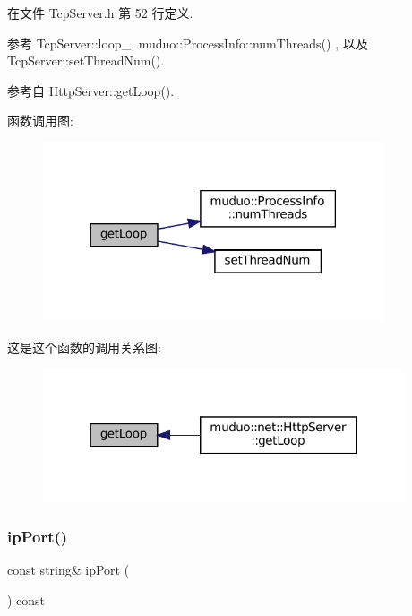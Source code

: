 在文件 Tcp\+Server.\+h 第 52 行定义.



参考 Tcp\+Server\+::loop\+\_\+, muduo\+::\+Process\+Info\+::num\+Threads() , 以及 Tcp\+Server\+::set\+Thread\+Num().



参考自 Http\+Server\+::get\+Loop().

函数调用图\+:
\nopagebreak
\begin{figure}[H]
\begin{center}
\leavevmode
\includegraphics[width=285pt]{classmuduo_1_1net_1_1TcpServer_aef1cbfe0592e8196e6c81b4db82a39ce_cgraph}
\end{center}
\end{figure}
这是这个函数的调用关系图\+:
\nopagebreak
\begin{figure}[H]
\begin{center}
\leavevmode
\includegraphics[width=303pt]{classmuduo_1_1net_1_1TcpServer_aef1cbfe0592e8196e6c81b4db82a39ce_icgraph}
\end{center}
\end{figure}
\mbox{\label{classmuduo_1_1net_1_1TcpServer_a99f658558edfb2a41612ef7be6884674}} 
\subsubsection{\texorpdfstring{ip\+Port()}{ipPort()}}
{\footnotesize\ttfamily const string\& ip\+Port (\begin{DoxyParamCaption}{ }\end{DoxyParamCaption}) const\hspace{0.3cm}{\ttfamily [inline]}}



